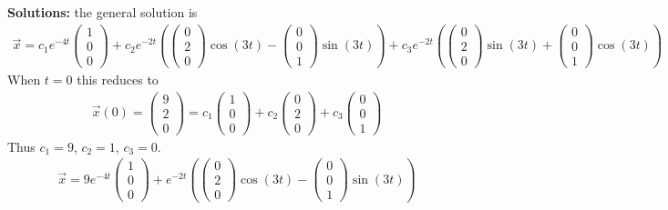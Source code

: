 \ifnum {} {\color{DarkBlue} 
\textbf{Solutions:} the general solution is
\begin{align*}
    \vec x = c_1 e^{-4t}\begin{pmatrix} 1\\0\\0\end{pmatrix} 
    + c_2e^{-2t}\left(\begin{pmatrix} 0\\2\\0\end{pmatrix} \cos(3t) - \begin{pmatrix} 0\\0\\1  \end{pmatrix} \sin(3t) \right) 
    + c_3e^{-2t}\left(\begin{pmatrix} 0\\2\\0\end{pmatrix} \sin(3t) + \begin{pmatrix} 0\\0\\1  \end{pmatrix} \cos(3t) \right) 
\end{align*}
When $t=0$ this reduces to
\begin{align*}
    \vec x(0) = \begin{pmatrix} 9\\2\\0\end{pmatrix} = c_1 \begin{pmatrix} 1\\0\\0\end{pmatrix} 
    + c_2 \begin{pmatrix} 0\\2\\0\end{pmatrix} 
    + c_3  \begin{pmatrix} 0\\0\\1  \end{pmatrix}  
\end{align*}
Thus $c_1= 9$, $c_2=1$, $c_3= 0$.
\begin{align*}
    \vec x = 9 e^{-4t}\begin{pmatrix} 1\\0\\0\end{pmatrix} 
    + e^{-2t}\left(\begin{pmatrix} 0\\2\\0\end{pmatrix} \cos(3t) - \begin{pmatrix} 0\\0\\1  \end{pmatrix} \sin(3t) \right) \end{align*}
} 
\else 
\newpage
\fi
\fi



